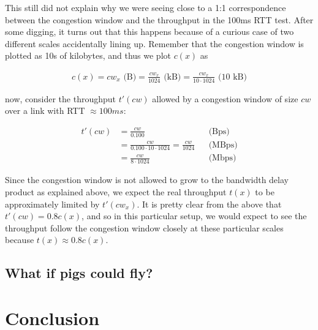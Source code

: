 \documentclass[12pt,a4paper]{article}
\begin{document}
This still did not explain why we were seeing close to a 1:1 correspondence
between the congestion window and the throughput in the 100ms RTT test. After
some digging, it turns out that this happens because of a curious case of two
different scales accidentally lining up. Remember that the congestion window is
plotted as 10s of kilobytes, and thus we plot $c(x)$ as

\begin{align*}
  c(x) = cw_x \text{\ (B)}
       = \frac{cw_x}{1024} \text{\ (kB)}
       = \frac{cw_x}{10 \cdot 1024} \text{\ (10 kB)}
\end{align*}

now, consider the throughput $t'(cw)$ allowed by a congestion window of size
$cw$ over a link with RTT $\approx 100ms$:

\begin{align*}
  t'(cw) &= \frac{cw}{0.100}                       &&\text{(Bps)} \\
         &= \frac{cw}{0.100 \cdot 10 \cdot 1024}
          = \frac{cw}{1024}                        &&\text{(MBps)} \\
         &= \frac{cw}{8 \cdot 1024}                &&\text{(Mbps)}
\end{align*}

Since the congestion window is not allowed to grow to the bandwidth delay
product as explained above, we expect the real throughput $t(x)$ to be
approximately limited by $t'(cw_x)$. It is pretty clear from the above that
$t'(cw) = 0.8 c(x)$, and so in this particular setup, we would expect to
see the throughput follow the congestion window closely at these particular
scales because $t(x) \approx 0.8 c(x)$.

\subsection{What if pigs could fly?} %

\section{Conclusion}

%
\end{document}
